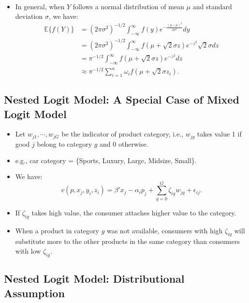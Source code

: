 \documentclass[
]{book}
\providecommand{\tightlist}{%
  \setlength{\itemsep}{0pt}\setlength{\parskip}{0pt}}
\begin{document}
\begin{itemize}
\tightlist
\item
  In general, when \(Y\) follows a normal distribution of mean \(\mu\) and standard deviation \(\sigma\), we have:
  \begin{equation}
  \begin{split}
  \mathbb{E}\{f(Y)\} &= (2 \pi \sigma^2)^{-1/2} \int_{-\infty}^\infty f(y) e^{-\frac{(y - \mu)^2}{2\sigma^2}} dy \\
  &=(2 \pi \sigma^2)^{-1/2} \int_{-\infty}^\infty f(\mu + \sqrt{2} \sigma z) e^{- z^2} \sqrt{2} \sigma dz \\
  &=\pi^{-1/2} \int_{-\infty}^\infty f(\mu + \sqrt{2} \sigma z) e^{- z^2} dz \\
  &\approx \pi^{-1/2} \sum_{i = 1}^n \omega_i f(\mu + \sqrt{2} \sigma z_i).
  \end{split}
  \end{equation}
\end{itemize}

\hypertarget{nested-logit-model-a-special-case-of-mixed-logit-model}{%
\subsection{Nested Logit Model: A Special Case of Mixed Logit Model}\label{nested-logit-model-a-special-case-of-mixed-logit-model}}

\begin{itemize}
\tightlist
\item
  Let \(w_{j1}, \cdots, w_{jG}\) be the indicator of product category, i.e., \(w_{jg}\) takes value 1 if good \(j\) belong to category \(g\) and 0 otherwise.
\item
  e.g., car category = \{Sports, Luxury, Large, Midsize, Small\}.
\item
  We have:
  \begin{equation}
  v(p, x_j, y_i, z_i) = \beta'x_j - \alpha_i p_j + \sum_{g = 0}^G \zeta_{ig} w_{jg} + \epsilon_{ij}.
  \end{equation}
\item
  If \(\zeta_{ig}\) takes high value, the consumer attaches higher value to the category.
\item
  When a product in category \(g\) was not available, consumers with high \(\zeta_{ig}\) will substitute more to the other products in the same category than consumers with low \(\zeta_{ig}\).
\end{itemize}

\hypertarget{nested-logit-model-distributional-assumption}{%
\subsection{Nested Logit Model: Distributional Assumption}\label{nested-logit-model-distributional-assumption}}
\end{document}
